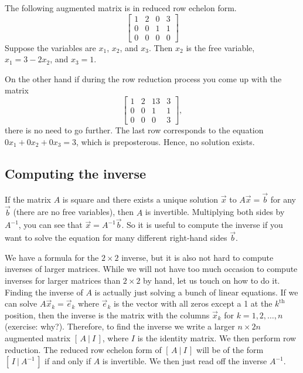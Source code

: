 \begin{example}
The following augmented matrix is in reduced row echelon form.
\begin{equation*}
\left[
\begin{array}{ccc|c}
1 & 2 & 0 & 3 \\
0 & 0 & 1 & 1 \\
0 & 0 & 0 & 0
\end{array}
\right]
\end{equation*}
Suppose
the variables are $x_1$, $x_2$, and $x_3$.  Then $x_2$ is the
free variable, $x_1 = 3 - 2x_2$, and $x_3 = 1$.

\medskip

On the other hand if during the row reduction process you come up with the
matrix
\begin{equation*}
\left[
\begin{array}{ccc|c}
1 & 2 & 13 & 3 \\
0 & 0 & 1 & 1 \\
0 & 0 & 0 & 3
\end{array}
\right]
,
\end{equation*}
there is no need to go further.  The last row corresponds to
the equation $0 x_1 + 0 x_2 + 0 x_3 = 3$, which is preposterous.  Hence, no
solution exists.
\end{example}

\subsection{Computing the inverse}

If the matrix $A$ is square and there exists a unique solution
$\vec{x}$ to $A \vec{x} = \vec{b}$ for any $\vec{b}$ (there are no free
variables), then $A$ is invertible.
Multiplying both sides by $A^{-1}$, you can see that $\vec{x} =
A^{-1} \vec{b}$.  So it is useful to compute the inverse if you want to
solve the equation for many different right-hand sides $\vec{b}$.

We have a formula for
the $2 \times 2$ inverse, but it is also not hard
to compute inverses of larger matrices.
While we will not have too much occasion to compute inverses for larger
matrices than $2 \times 2$ by hand, let us touch on how to do it.
Finding the inverse of $A$ is actually just solving a bunch of linear
equations.  If we can solve $A \vec{x}_k = \vec{e}_k$ where $\vec{e}_k$ is
the vector with all zeros except a 1 at the $k^{\text{th}}$ position, then
the inverse is the matrix with the columns $\vec{x}_k$ for $k=1,2,\ldots,n$
(exercise: why?).  Therefore, to find the inverse we write a larger $n
\times 2n$ augmented matrix $[ \,A ~|~ I\, ]$, where $I$ is the identity
matrix.
We then perform row reduction.
The reduced row echelon form of $[ \,A ~|~ I\, ]$ 
will be of the form $[ \,I ~|~ A^{-1}\, ]$ if and only if
$A$ is invertible.  We then just read off the inverse $A^{-1}$.

